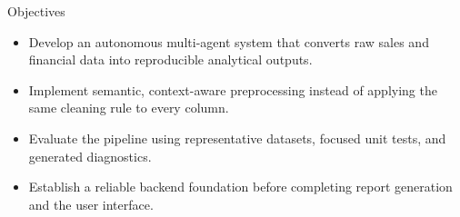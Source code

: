 
\begin{frame}{Objectives}
    \begin{itemize}
        \item Develop an autonomous multi-agent system that converts raw sales and financial data into reproducible analytical outputs.
        \item Implement semantic, context-aware preprocessing instead of applying the same cleaning rule to every column.
        \item Evaluate the pipeline using representative datasets, focused unit tests, and generated diagnostics.
        \item Establish a reliable backend foundation before completing report generation and the user interface.
    \end{itemize}
\end{frame}
